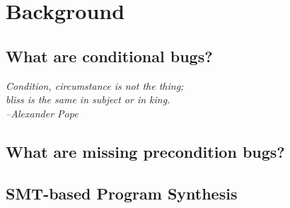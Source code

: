 \chapter{Background}
\label{background}

\section{What are conditional bugs?}
{\begin{small}%
\begin{flushright}%
\it
Condition, circumstance is not the thing; \\ bliss is the same in subject or in king. \\
--Alexander Pope
\end{flushright}%
\end{small}%
\vspace{.5cm}}



\section{What are missing precondition bugs?}

\section{SMT-based Program Synthesis}
